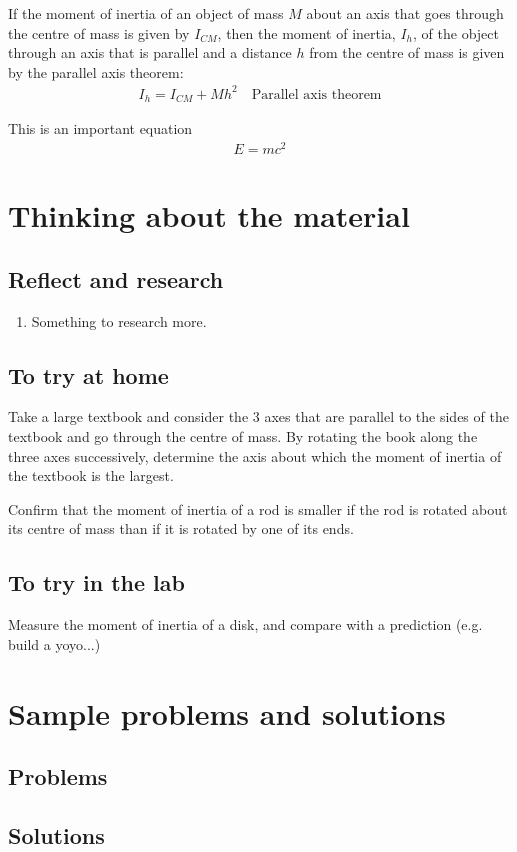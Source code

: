 \begin{chapterSummary}
If the moment of inertia of an object of mass $M$ about an axis that goes through the centre of mass is given by $I_{CM}$, then the moment of inertia, $I_h$, of the object through an axis that is parallel and a distance $h$ from the centre of mass is given by the parallel axis theorem:
\begin{align*}
I_h = I_{CM} + Mh^2 \quad \text{Parallel axis theorem}
\end{align*}



\end{chapterSummary}

\newpage
\begin{importantEquations}
This is an important equation
\begin{align*}
E = mc^2
\end{align*}

\end{importantEquations}


\newpage
\section{Thinking about the material}
\subsection{Reflect and research}

\begin{enumerate}
\item Something to research more.
\end{enumerate}
\subsection{To try at home}

\begin{tQuestion}Take a large textbook and consider the 3 axes that are parallel to the sides of the textbook and go through the centre of mass. By rotating the book along the three axes successively, determine the axis about which the moment of inertia of the textbook is the largest.\end{tQuestion}

\begin{tQuestion}Confirm that the moment of inertia of a rod is smaller if the rod is rotated about its centre of mass than if it is rotated by one of its ends.\end{tQuestion}


\subsection{To try in the lab}
Measure the moment of inertia of a disk, and compare with a prediction (e.g. build a yoyo...)

\newpage
\section{Sample problems and solutions}
\subsection{Problems}


\newpage
\subsection{Solutions}


